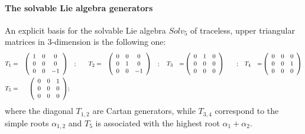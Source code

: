 \documentclass[10pt,a4paper]{article}
\begin{document}
\paragraph{The solvable Lie algebra generators}
An explicit basis for the solvable Lie algebra $Solv_{5}$ of traceless, upper triangular matrices in $3$-dimension is the following one:
\begin{alignat}{9}\label{barbagianni}
  T_1 & = & \left(
\begin{array}{ccc}
 1 & 0 & 0 \\
 0 & 0 & 0 \\
 0 & 0 & -1 \\
\end{array}
\right) & \quad ; \quad &  T_2 & = & \left(
\begin{array}{ccc}
 0 & 0 & 0 \\
 0 & 1 & 0 \\
 0 & 0 & -1 \\
\end{array}
\right) & \quad ; \quad
  T_3 & = & \left(
\begin{array}{ccc}
 0 & 1 & 0 \\
 0 & 0 & 0 \\
 0 & 0 & 0 \\
\end{array}
\right) & \quad ; \quad &  T_4 & = & \left(
\begin{array}{ccc}
 0 & 0 & 0 \\
 0 & 0 & 1 \\
 0 & 0 & 0 \\
\end{array}
\right) \nonumber\\
  T_5 & = & \left(
\begin{array}{ccc}
 0 & 0 & 1 \\
 0 & 0 & 0 \\
 0 & 0 & 0 \\
\end{array}
\right) & ; &  \null & \null & \null \nonumber\\
\end{alignat}
where the diagonal $T_{1,2}$ are Cartan generators, while $T_{3,4}$ correspond to the simple roots $\alpha_{1,2}$ and $T_5$ is associated with the highest root $\alpha_1+\alpha_2$.
\end{document}
